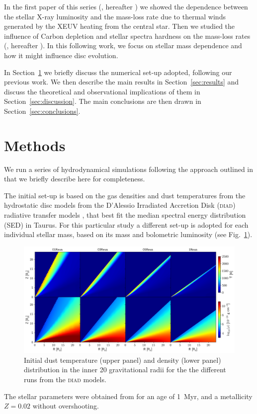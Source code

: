 \documentclass[usenatbib,useAMS,usedcolumn]{mnras}
\begin{document}
In the first paper of this series (, hereafter ) we showed the dependence between the stellar X-ray luminosity and the mass-loss rate due to thermal winds generated by the XEUV heating from the central star. Then we studied the influence of Carbon depletion  and stellar spectra hardness on the mass-loss rates (, hereafter ). In this following work, we focus on stellar mass dependence and how it might influence disc evolution.

In Section~\ref{sec:methods} we briefly discuss the numerical set-up adopted, following our previous work. We then describe the main results in Section~\ref{sec:results} and discuss the theoretical and observational implications of them in Section~\ref{sec:discussion}. The main conclusions are then drawn in Section~\ref{sec:conclusions}.

\section{Methods}\label{sec:methods}
We run a series of hydrodynamical simulations following the approach outlined in  that we briefly describe here for completeness.

The initial set-up is based on the gas densities and dust temperatures from the hydrostatic disc models from the D’Alessio Irradiated Accretion Disk (\textsc{diad}) radiative transfer models , that best fit the median spectral energy distribution (SED) in Taurus. 
For this particular study a different set-up is adopted for each individual stellar mass, based on its mass and bolometric luminosity (see Fig.~\ref{fig:initdiscs}).
\begin{figure}
    \centering
    \includegraphics[width=\textwidth]{Figure1}
    \caption{Initial dust temperature (upper panel) and density (lower panel) distribution in the inner 20 gravitational radii for the the different runs from the \textsc{diad} models. \label{fig:initdiscs}}
\end{figure}
The stellar parameters were obtained from  for an age of \SI{1}{Myr}, and a metallicity $Z=0.02$ without overshooting.
\end{document}
